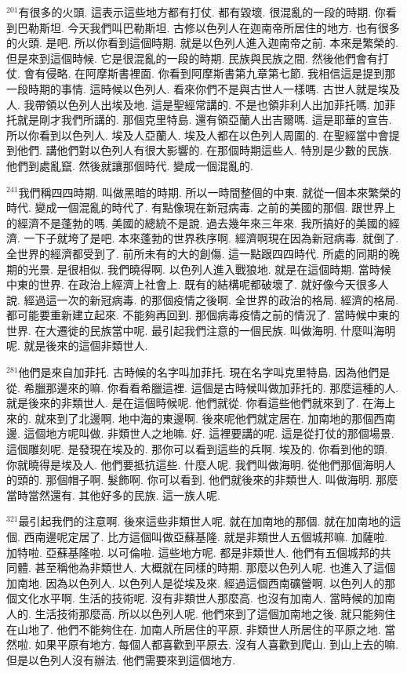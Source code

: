 \documentclass{book}
\begin{document}
$^{201}$有很多的火頭.
這表示這些地方都有打仗.
都有毀壞.
很混亂的一段的時期.
你看到巴勒斯坦.
今天我們叫巴勒斯坦.
古修以色列人在迦南帝所居住的地方.
也有很多的火頭.
是吧.
所以你看到這個時期.
就是以色列人進入迦南帝之前.
本來是繁榮的.
但是來到這個時候.
它是很混亂的一段的時期.
民族與民族之間.
然後他們會有打仗.
會有侵略.
在阿摩斯書裡面.
你看到阿摩斯書第九章第七節.
我相信這是提到那一段時期的事情.
這時候以色列人.
看來你們不是與古世人一樣嗎.
古世人就是埃及人.
我帶領以色列人出埃及地.
這是聖經常講的.
不是也領非利人出加菲托嗎.
加菲托就是剛才我們所講的.
那個克里特島.
還有領亞蘭人出吉爾嗎.
這是耶華的宣告.
所以你看到以色列人.
埃及人亞蘭人.
埃及人都在以色列人周圍的.
在聖經當中會提到他們.
講他們對以色列人有很大影響的.
在那個時期這些人.
特別是少數的民族.
他們到處亂竄.
然後就讓那個時代.
變成一個混亂的.

$^{241}$我們稱四四時期.
叫做黑暗的時期.
所以一時間整個的中東.
就從一個本來繁榮的時代.
變成一個混亂的時代了.
有點像現在新冠病毒.
之前的美國的那個.
跟世界上的經濟不是蓬勃的嗎.
美國的總統不是說.
過去幾年來三年來.
我所搞好的美國的經濟.
一下子就垮了是吧.
本來蓬勃的世界秩序啊.
經濟啊現在因為新冠病毒.
就倒了.
全世界的經濟都受到了.
前所未有的大的創傷.
這一點跟四四時代.
所處的同期的晚期的光景.
是很相似.
我們曉得啊.
以色列人進入戰狼地.
就是在這個時期.
當時候中東的世界.
在政治上經濟上社會上.
既有的結構呢都破壞了.
就好像今天很多人說.
經過這一次的新冠病毒.
的那個疫情之後啊.
全世界的政治的格局.
經濟的格局.
都可能要重新建立起來.
不能夠再回到.
那個病毒疫情之前的情況了.
當時候中東的世界.
在大遷徙的民族當中呢.
最引起我們注意的一個民族.
叫做海明.
什麼叫海明呢.
就是後來的這個非類世人.

$^{281}$他們是來自加菲托.
古時候的名字叫加菲托.
現在名字叫克里特島.
因為他們是從.
希臘那邊來的嘛.
你看看希臘這裡.
這個是古時候叫做加菲托的.
那麼這種的人.
就是後來的非類世人.
是在這個時候呢.
他們就從.
你看這些他們就來到了.
在海上來的.
就來到了北邊啊.
地中海的東邊啊.
後來呢他們就定居在.
加南地的那個西南邊.
這個地方呢叫做.
非類世人之地嘛.
好.
這裡要講的呢.
這是從打仗的那個場景.
這個雕刻呢.
是發現在埃及的.
那你可以看到這些的兵啊.
埃及的.
你看到他的頭.
你就曉得是埃及人.
他們要抵抗這些.
什麼人呢.
我們叫做海明.
從他們那個海明人的頭的.
那個帽子啊.
髮飾啊.
你可以看到.
他們就後來的非類世人.
叫做海明.
那麼當時當然還有.
其他好多的民族.
這一族人呢.

$^{321}$最引起我們的注意啊.
後來這些非類世人呢.
就在加南地的那個.
就在加南地的這個.
西南邊呢定居了.
比方這個叫做亞蘇基隆.
就是非類世人五個城邦嘛.
加薩啦.
加特啦.
亞蘇基隆啦.
以可倫啦.
這些地方呢.
都是非類世人.
他們有五個城邦的共同體.
甚至稱他為非類世人.
大概就在同樣的時期.
那麼以色列人呢.
也進入了這個加南地.
因為以色列人.
以色列人是從埃及來.
經過這個西南礦營啊.
以色列人的那個文化水平啊.
生活的技術呢.
沒有非類世人那麼高.
也沒有加南人.
當時候的加南人的.
生活技術那麼高.
所以以色列人呢.
他們來到了這個加南地之後.
就只能夠住在山地了.
他們不能夠住在.
加南人所居住的平原.
非類世人所居住的平原之地.
當然啦.
如果平原有地方.
每個人都喜歡到平原去.
沒有人喜歡到爬山.
到山上去的嘛.
但是以色列人沒有辦法.
他們需要來到這個地方.
\end{document}
